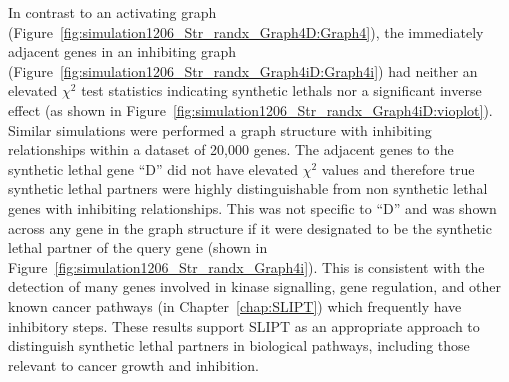 In contrast to an activating graph (Figure~\ref{fig:simulation1206_Str_randx_Graph4D:Graph4}), the immediately adjacent genes  in an inhibiting graph (Figure~\ref{fig:simulation1206_Str_randx_Graph4iD:Graph4i}) had neither an elevated $\chi^2$ test statistics indicating \glspl{synthetic lethal} nor a significant inverse effect (as shown in Figure~\ref{fig:simulation1206_Str_randx_Graph4iD:vioplot}). Similar simulations were performed a \gls{graph} structure with inhibiting relationships within a dataset of 20,000 genes. The adjacent genes to the \gls{synthetic lethal} gene ``D'' did not have elevated $\chi^2$ values and therefore true \gls{synthetic lethal} partners were highly distinguishable from non \gls{synthetic lethal} genes with inhibiting relationships. This was not specific to ``D'' and was shown across any gene in the \gls{graph} structure if it were designated to be the \gls{synthetic lethal} partner of the query gene (shown in Figure~\ref{fig:simulation1206_Str_randx_Graph4i}). This is consistent with the detection of many genes involved in kinase signalling, gene regulation, and other known cancer pathways (in Chapter~\ref{chap:SLIPT}) which frequently have inhibitory steps. These results support \gls{SLIPT} as an appropriate approach to distinguish \gls{synthetic lethal} partners in biological pathways, including those relevant to cancer growth and inhibition.


\iffalse
\begin{figure*}[!ht]
     \begin{center}
       \subcaptionbox{Graph Structure}{%
           \raisebox{0.15\textwidth}{
           \label{fig:simulation1206_Str_randx_Graph4iD:Graph4i}
           \texttt{[image: \{"/home/tomkelly/Documents/PhD Otago Uni/SL\_Model/Graph4iD".pdf]}}
           }
        }%
       \subcaptionbox{$\chi^2$ distribution for each gene}{%
           \label{fig:simulation1206_Str_randx_Graph4iD:vioplot}
           \texttt{[image: \{"/home/tomkelly/Documents/PhD Otago Uni/SL\_Model//RUN\_20161206\_Str\_randx/SL\_Model\_Test\_Graph\_1K\_Graph4i\_ROC\_samples\_SLstry\_vioplot(4)".pdf]}}
        }%
       \end{center}
      \caption[Detection of Synthetic Lethality within an Inhibiting Graph Structure]{\small \textbf{Detection of Synthetic Lethality within an Inhibiting  Graph Structure.} The gene ``D'' was designated to be \gls{synthetic lethal} and the $\chi^2$ value from \gls{SLIPT} was computed for each gene across the \gls{graph} structure. The $\chi^2$ values were computed in 100 simulations of datasets of 20,000 genes including the \gls{graph} structure and 1000 samples.}
\end{figure*}
\fi

